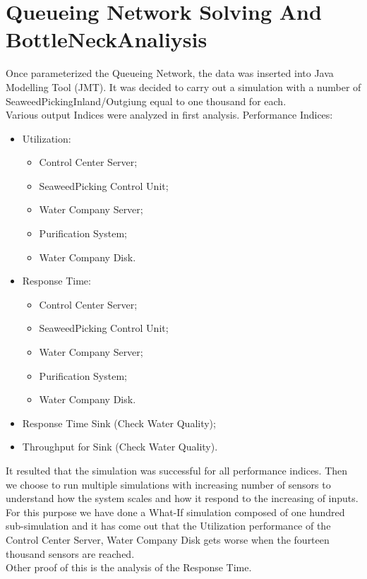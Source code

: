 \chapter{\textbf{Queueing Network Solving And BottleNeckAnaliysis}}

Once parameterized the Queueing Network, the data was inserted into Java Modelling Tool (JMT). It was decided to carry out a simulation with a number of SeaweedPickingInland/Outgiung equal to one thousand for each.\\
Various output Indices were analyzed in first analysis. Performance Indices:
\begin{itemize}
\item Utilization:
	\begin{itemize}
		\item Control Center Server;
		\item SeaweedPicking Control Unit;
		\item Water Company Server;
		\item Purification System;
		\item Water Company Disk.
	\end{itemize}
\item Response Time:
	\begin{itemize}
		\item Control Center Server;
		\item SeaweedPicking Control Unit;
		\item Water Company Server;
		\item Purification System;
		\item Water Company Disk.
	\end{itemize}
\item Response Time Sink (Check Water Quality);
\item Throughput for Sink (Check Water Quality).
\end{itemize}

\begin{center}
\end{center}

\begin{center}
\end{center}
\bigskip

It resulted that the simulation was successful for all performance
indices. Then we choose to run multiple simulations with increasing
number of sensors to understand how the system scales and how it
respond to the increasing of inputs. For this purpose we have done a What-If simulation composed of one hundred sub-simulation and it has come out that the Utilization performance of the Control Center Server, Water Company Disk gets worse when the fourteen thousand sensors are reached.\\
Other proof of this is the analysis of the Response Time.

